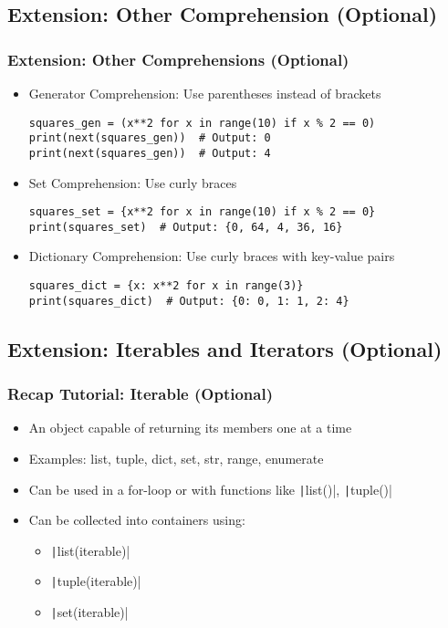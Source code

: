 \documentclass{beamer}
\begin{document}
\subsection{Extension: Other Comprehension (Optional)}

\begin{frame}[fragile]
    \frametitle{Extension: Other Comprehensions (Optional)}
    \begin{itemize}
        \item Generator Comprehension: Use parentheses instead of brackets
              \begin{verbatim}
squares_gen = (x**2 for x in range(10) if x % 2 == 0)
print(next(squares_gen))  # Output: 0
print(next(squares_gen))  # Output: 4
              \end{verbatim}
        \item Set Comprehension: Use curly braces
              \begin{verbatim}
squares_set = {x**2 for x in range(10) if x % 2 == 0}
print(squares_set)  # Output: {0, 64, 4, 36, 16}
              \end{verbatim}
        \item Dictionary Comprehension: Use curly braces with key-value pairs
              \begin{verbatim}
squares_dict = {x: x**2 for x in range(3)}
print(squares_dict)  # Output: {0: 0, 1: 1, 2: 4}
              \end{verbatim}
    \end{itemize}
\end{frame}

\subsection{Extension: Iterables and Iterators (Optional)}
\begin{frame}
    \frametitle{Recap Tutorial: Iterable (Optional)}
    \begin{itemize}
        \item An object capable of returning its members one at a time
        \item Examples: list, tuple, dict, set, str, range, enumerate
        \item Can be used in a for-loop or with functions like \texttt|list()|, \texttt|tuple()|
        \item Can be collected into containers using:
              \begin{itemize}
                  \item \texttt|list(iterable)|
                  \item \texttt|tuple(iterable)|
                  \item \texttt|set(iterable)|
              \end{itemize}
    \end{itemize}
\end{frame}
\end{document}
